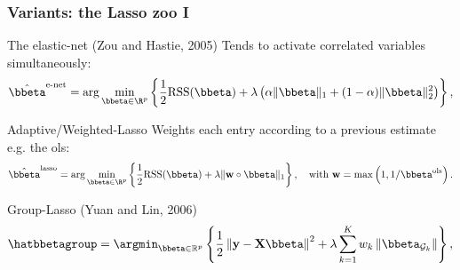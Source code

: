\documentclass{beamer}\usepackage[]{graphicx}\usepackage[]{color}
\begin{document}
\begin{frame}
  \frametitle{Variants: the Lasso zoo I}
  \begin{small}
  \begin{block}{The elastic-net (Zou and Hastie, 2005)}
    Tends to activate correlated variables simultaneously:
    \begin{equation*}
      \hat{\bbeta}^{\text{e-net}} = \arg \min_{\bbeta\in \R^p} 
      \left\{\frac{1}{2}\text{RSS}(\bbeta)   +   \lambda   \left(   \alpha
          \|\bbeta \|_1 + (1-\alpha) \|\bbeta\|_2^2 \right) \right\},
    \end{equation*}   
  \end{block}

  \begin{block}{Adaptive/Weighted-Lasso}
    Weights each entry according to a previous estimate e.g. the ols:
    \begin{equation*}
      \hat{\bbeta}^{\text{lasso}} = \arg \min_{\bbeta\in \R^p} 
      \left\{\frac{1}{2}\text{RSS}(\bbeta)  +  \lambda \|\mathbf{w}  \circ
        \bbeta\|_1   \right\},  \quad   \text{with   }  \mathbf{w}   =
      \max\left(1,1/\bbeta^{\mathrm{ols}}\right).
    \end{equation*}
  \end{block}

  \begin{block}{Group-Lasso (Yuan and Lin, 2006)}
  \vspace{-.5cm}
    \begin{equation*}
      \hatbbetagroup = \argmin_{\bbeta\in\mathbb{R}^p} \left\{
        \frac{1}{2}\left\| \mathbf{y} - \mathbf{X}\bbeta \right\|^2 + 
        \lambda \sum_{k=1}^K w_k \left\|\bbeta_{\mathcal{G}_k} \right\| \right\},
    \end{equation*}
  \end{block}
  \end{small}
\end{frame}
\end{document}
